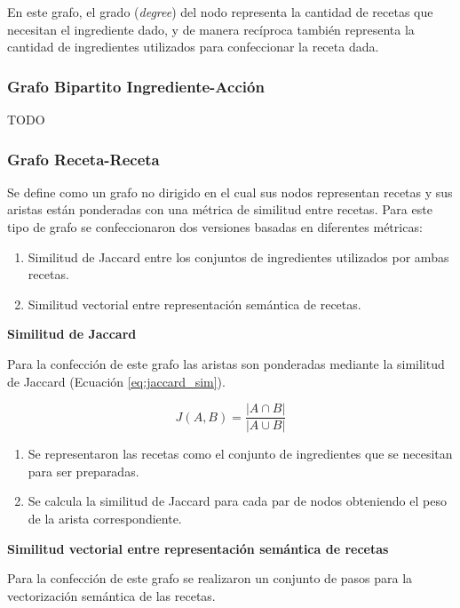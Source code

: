 \documentclass[
	a4paper, %
	10pt, %
	unnumberedsections, %
	twoside, %
]{LTJournalArticle}
\begin{document}
En este grafo, el grado (\textit{degree}) del nodo representa la cantidad de recetas que necesitan
el ingrediente dado, y de manera recíproca también representa la cantidad de ingredientes utilizados para 
confeccionar la receta dada.

\subsubsection{Grafo Bipartito Ingrediente-Acción}

TODO

\subsubsection{Grafo Receta-Receta}

Se define como un grafo no dirigido en el cual sus nodos representan recetas y sus aristas
están ponderadas con una métrica de similitud entre recetas. Para este tipo de grafo se confeccionaron dos 
versiones basadas en diferentes métricas:

\begin{enumerate}
	\item Similitud de Jaccard entre los conjuntos de ingredientes utilizados por ambas recetas.
	\item Similitud vectorial entre representación semántica de recetas.
\end{enumerate}

\textbf{Similitud de Jaccard}

Para la confección de este grafo las aristas son ponderadas mediante la similitud de Jaccard (Ecuación \ref{eq:jaccard_sim}).

\begin{equation}
	J(A, B) = \frac{|A \cap B|}{|A \cup B|}
	\label{eq:jaccard_sim}
\end{equation}

\begin{enumerate}
	\item Se representaron las recetas como el conjunto de ingredientes que se necesitan para ser preparadas.
	\item Se calcula la similitud de Jaccard para cada par de nodos obteniendo el peso de la arista correspondiente.
\end{enumerate}

\textbf{Similitud vectorial entre representación semántica de recetas}

Para la confección de este grafo se realizaron un conjunto de pasos para la vectorización semántica de las recetas.
\end{document}

